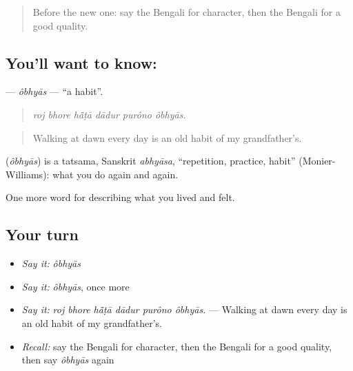 \begin{quote}
Before the new one: say the Bengali for character, then the Bengali for a good quality.
\end{quote}

\subsection*{You'll want to know: }
\textbf{} — \emph{ôbhyās} — \textquotedblleft{}a habit\textquotedblright{}.

\begin{quote}
     
\end{quote}

\begin{quote}
\emph{roj bhore hā̃ṭā dādur purôno ôbhyās.}
\end{quote}

\begin{quote}
Walking at dawn every day is an old habit of my grandfather's.
\end{quote}

\begin{cousinweb}
\textbf{} (\emph{ôbhyās}) is a tatsama, Sanskrit \emph{abhyāsa}, \textquotedblleft{}repetition, practice, habit\textquotedblright{} (Monier-Williams): what you do again and again.
\end{cousinweb}

\begin{grammarlens}[title={What you've built}]
One more word for describing what you lived and felt.
\end{grammarlens}

\subsection*{Your turn}
\begin{itemize}
\raggedright
  \item \emph{Say it:} \emph{ôbhyās}
  \item \emph{Say it:} \emph{ôbhyās}, once more
  \item \emph{Say it:} \emph{roj bhore hā̃ṭā dādur purôno ôbhyās.} — Walking at dawn every day is an old habit of my grandfather's.
  \item \emph{Recall:} say the Bengali for character, then the Bengali for a good quality, then say \emph{ôbhyās} again
\end{itemize}

